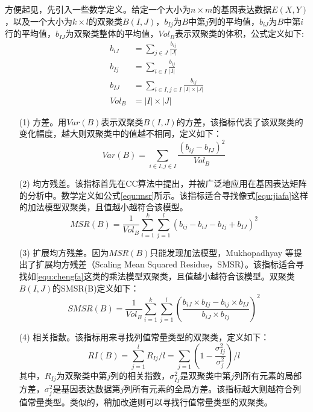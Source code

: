   方便起见，先引入一些数学定义。给定一个大小为$n\times m$的基因表达数据$E(X,Y)$，以及一个大小为$k\times l$的双聚类$B(I,J)$，$b_{Ij}$为$B$中第$j$列的平均值，$b_{iJ}$为$B$中第$i$行的平均值，$b_{IJ}$为双聚类整体的平均值，$Vol_B$表示双聚类的体积，公式定义如下:
  \begin{align}
    b_{iJ} &= \sum_{j\in J}\frac{b_{ij}}{|J|} \\
    b_{Ij} &= \sum_{i\in I}\frac{b_{ij}}{|I|} \\
    b_{IJ} &= \sum_{i\in I,j\in I}\frac{ b_{ij} }{|I| \times |J|}\\
    Vol_B &= |I| \times |J|
  \end{align}
  \begin{enumerate}
    \item[(1)] 方差。用$Var(B)$表示双聚类$B(I,J)$的方差，该指标代表了该双聚类的变化幅度，越大则双聚类中的值越不相同，定义如下：
    \begin{equation}
      Var(B) = \sum_{i\in I,j\in I}\frac{(b_{ij}-b_{IJ})^2}{Vol_B}
    \end{equation}

    \item[(2)] 均方残差。该指标首先在CC算法中提出，并被广泛地应用在基因表达矩阵的分析中。数学定义如公式\ref{equ:msr}所示。该指标适合寻找像式\ref{equ:jiafa}这样的加法模型双聚类，且值越小越符合该模型。
    \begin{equation}\label{equ:msr}
      MSR(B) = \frac{1}{Vol_B}\sum_{i=1}^k\sum_{j=1}^l(b_{ij}-b_{iJ}-b_{Ij}+b_{IJ})^2
    \end{equation}

    \item[(3)] 扩展均方残差。因为$MSR(B)$只能发现加法模型，Mukhopadhyay 等提出了扩展均方残差（Scaling Mean Squared Residue，SMSR）。该指标适合寻找如\ref{equ:chengfa}这类的乘法模型双聚类，且值越小越符合该模型。双聚类$B(I,J)$的SMSR(B)定义如下：
    \begin{equation}\label{equ:smsr}
      SMSR(B) = \frac{1}{Vol_B}\sum_{i=1}^k\sum_{j=1}^l(\frac{b_{iJ}\times b_{Ij}-b_{ij}\times b_{IJ}}{b_{iJ}\times b_{Ij}})^2
    \end{equation}

    \item[(4)] 相关指数。该指标用来寻找列值常量类型的双聚类，定义如下：
    \begin{equation}
      RI(B) = \sum_{j=1}^l R_{Ij}/l = \sum_{j=1}(1 - \frac{\sigma_{Ij}^2}{\sigma_j^2})/l
    \end{equation}
    \hspace{2em} 其中，$R_{Ij}$为双聚类中第$j$列的相关指数，$\sigma_{Ij}^2$是双聚类中第$j$列所有元素的局部方差，$\sigma_{j}^2$是基因表达数据第$j$列所有元素的全局方差。该指标越大则越符合列值常量类型。类似的，稍加改造则可以寻找行值常量类型的双聚类。


\end{enumerate}
